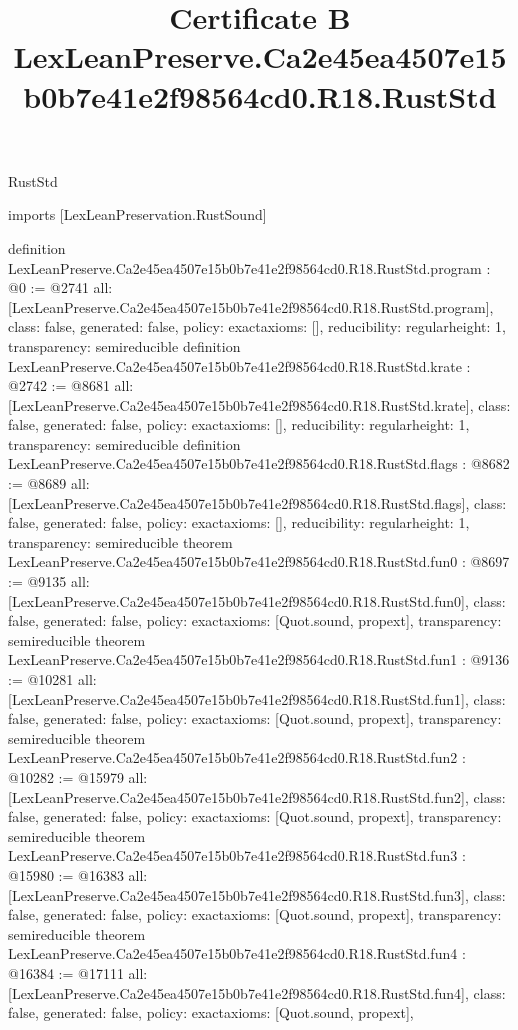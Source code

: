\begin{lexlean}{RustStd}
\title{Certificate B LexLeanPreserve.Ca2e45ea4507e15b0b7e41e2f98564cd0.R18.RustStd}
\begin{coremodule}
imports [LexLeanPreservation.RustSound]

definition LexLeanPreserve.Ca2e45ea4507e15b0b7e41e2f98564cd0.R18.RustStd.program : @0 := @2741 {
  all: [LexLeanPreserve.Ca2e45ea4507e15b0b7e41e2f98564cd0.R18.RustStd.program],
  class: false,
  generated: false,
  policy: exact{axioms: []},
  reducibility: regular{height: 1},
  transparency: semireducible
}
definition LexLeanPreserve.Ca2e45ea4507e15b0b7e41e2f98564cd0.R18.RustStd.krate : @2742 := @8681 {
  all: [LexLeanPreserve.Ca2e45ea4507e15b0b7e41e2f98564cd0.R18.RustStd.krate],
  class: false,
  generated: false,
  policy: exact{axioms: []},
  reducibility: regular{height: 1},
  transparency: semireducible
}
definition LexLeanPreserve.Ca2e45ea4507e15b0b7e41e2f98564cd0.R18.RustStd.flags : @8682 := @8689 {
  all: [LexLeanPreserve.Ca2e45ea4507e15b0b7e41e2f98564cd0.R18.RustStd.flags],
  class: false,
  generated: false,
  policy: exact{axioms: []},
  reducibility: regular{height: 1},
  transparency: semireducible
}
theorem LexLeanPreserve.Ca2e45ea4507e15b0b7e41e2f98564cd0.R18.RustStd.fun0 : @8697 := @9135 {
  all: [LexLeanPreserve.Ca2e45ea4507e15b0b7e41e2f98564cd0.R18.RustStd.fun0],
  class: false,
  generated: false,
  policy: exact{axioms: [Quot.sound, propext]},
  transparency: semireducible
}
theorem LexLeanPreserve.Ca2e45ea4507e15b0b7e41e2f98564cd0.R18.RustStd.fun1 : @9136 := @10281 {
  all: [LexLeanPreserve.Ca2e45ea4507e15b0b7e41e2f98564cd0.R18.RustStd.fun1],
  class: false,
  generated: false,
  policy: exact{axioms: [Quot.sound, propext]},
  transparency: semireducible
}
theorem LexLeanPreserve.Ca2e45ea4507e15b0b7e41e2f98564cd0.R18.RustStd.fun2 : @10282 := @15979 {
  all: [LexLeanPreserve.Ca2e45ea4507e15b0b7e41e2f98564cd0.R18.RustStd.fun2],
  class: false,
  generated: false,
  policy: exact{axioms: [Quot.sound, propext]},
  transparency: semireducible
}
theorem LexLeanPreserve.Ca2e45ea4507e15b0b7e41e2f98564cd0.R18.RustStd.fun3 : @15980 := @16383 {
  all: [LexLeanPreserve.Ca2e45ea4507e15b0b7e41e2f98564cd0.R18.RustStd.fun3],
  class: false,
  generated: false,
  policy: exact{axioms: [Quot.sound, propext]},
  transparency: semireducible
}
theorem LexLeanPreserve.Ca2e45ea4507e15b0b7e41e2f98564cd0.R18.RustStd.fun4 : @16384 := @17111 {
  all: [LexLeanPreserve.Ca2e45ea4507e15b0b7e41e2f98564cd0.R18.RustStd.fun4],
  class: false,
  generated: false,
  policy: exact{axioms: [Quot.sound, propext]},
}
\end{coremodule}
\end{lexlean}
